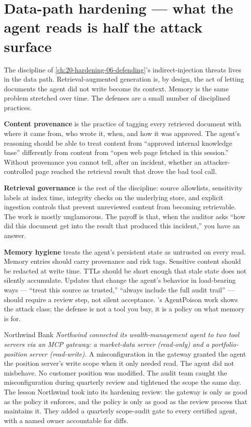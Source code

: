 \section{Data-path hardening --- what the agent reads is half the attack surface}

The discipline of \autoref{ch:20-hardening-06-defending}'s indirect-injection threats lives in the data path. Retrieval-augmented generation is, by design, the act of letting documents the agent did not write become its context. Memory is the same problem stretched over time. The defenses are a small number of disciplined practices.

\textbf{Content provenance} is the practice of tagging every retrieved document with where it came from, who wrote it, when, and how it was approved. The agent's reasoning should be able to treat content from ``approved internal knowledge base'' differently from content from ``open web page fetched in this session.'' Without provenance you cannot tell, after an incident, whether an attacker-controlled page reached the retrieval result that drove the bad tool call.

\textbf{Retrieval governance} is the rest of the discipline: source allowlists, sensitivity labels at index time, integrity checks on the underlying store, and explicit ingestion controls that prevent unreviewed content from becoming retrievable. The work is mostly unglamorous. The payoff is that, when the auditor asks ``how did this document get into the result that produced this incident,'' you have an answer.

\textbf{Memory hygiene} treats the agent's persistent state as untrusted on every read. Memory entries should carry provenance and risk tags. Sensitive content should be redacted at write time. TTLs should be short enough that stale state does not silently accumulate. Updates that change the agent's behavior in load-bearing ways --- ``treat this source as trusted,'' ``always include the full audit trail'' --- should require a review step, not silent acceptance. \citet{chen2024memorypoison}'s AgentPoison work shows the attack class; the defense is not a tool you buy, it is a policy on what memory is for.

\begin{TNinpractice}{Northwind Bank}
\textit{Northwind connected its wealth-management agent to two tool servers via an MCP gateway: a market-data server (read-only) and a portfolio-position server (read-write).} A misconfiguration in the gateway granted the agent the position server's write scope when it only needed read. The agent did not misbehave. No customer position was modified. The audit team caught the misconfiguration during quarterly review and tightened the scope the same day. The lesson Northwind took into its hardening review: the gateway is only as good as the policy it enforces, and the policy is only as good as the review process that maintains it. They added a quarterly scope-audit gate to every certified agent, with a named owner accountable for diffs.
\end{TNinpractice}

